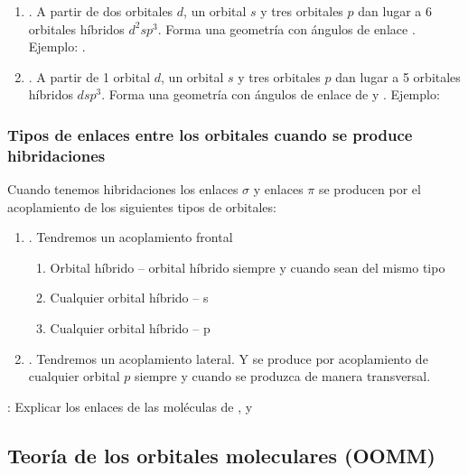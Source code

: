 \begin{enumerate}[label=\numberballmDarkBrown]
        \item {}.
        A partir de dos orbitales $d$, un orbital $s$ y tres orbitales $p$ dan lugar a 6 orbitales híbridos $d^2sp^3$.
        Forma una geometría  con ángulos de enlace .
        Ejemplo: .
        \item {}.
        A partir de 1 orbital $d$, un orbital $s$ y tres orbitales $p$ dan lugar a 5 orbitales híbridos $dsp^3$.
        Forma una geometría  con ángulos de enlace de  y .
        Ejemplo: 
\end{enumerate}

\subsubsection{Tipos de enlaces entre los orbitales cuando se produce hibridaciones}
Cuando tenemos hibridaciones los enlaces $\sigma$ y enlaces $\pi$ se producen por el acoplamiento de los siguientes tipos de orbitales:
\begin{enumerate}[label=\numberballmDarkTeal]
        \item {}.
        Tendremos un acoplamiento frontal
        \begin{enumerate}
            \item Orbital híbrido -- orbital híbrido siempre y cuando sean del mismo tipo
            \item Cualquier orbital híbrido -- s
            \item Cualquier orbital híbrido -- p
        \end{enumerate}
        \item {}.
        Tendremos un acoplamiento lateral.
        Y se produce por acoplamiento de cualquier orbital $p$ siempre y cuando se produzca de manera transversal.
\end{enumerate}

: Explicar los enlaces de las moléculas de ,  y 

\subsection{Teoría de los orbitales moleculares (OOMM)}\label{subsec:teoria-de-los-orbitales-moleculares-(oomm)}


